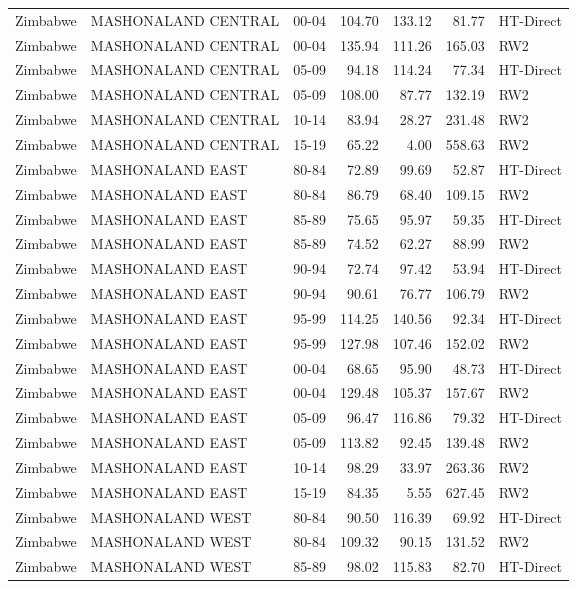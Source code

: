 \begin{longtable}{lllrrrl}
  Zimbabwe & MASHONALAND CENTRAL & 00-04 & 104.70 & 133.12 & 81.77 & HT-Direct \\ 
  Zimbabwe & MASHONALAND CENTRAL & 00-04 & 135.94 & 111.26 & 165.03 & RW2 \\ 
  Zimbabwe & MASHONALAND CENTRAL & 05-09 & 94.18 & 114.24 & 77.34 & HT-Direct \\ 
  Zimbabwe & MASHONALAND CENTRAL & 05-09 & 108.00 & 87.77 & 132.19 & RW2 \\ 
  Zimbabwe & MASHONALAND CENTRAL & 10-14 & 83.94 & 28.27 & 231.48 & RW2 \\ 
  Zimbabwe & MASHONALAND CENTRAL & 15-19 & 65.22 & 4.00 & 558.63 & RW2 \\ 
  Zimbabwe & MASHONALAND EAST & 80-84 & 72.89 & 99.69 & 52.87 & HT-Direct \\ 
  Zimbabwe & MASHONALAND EAST & 80-84 & 86.79 & 68.40 & 109.15 & RW2 \\ 
  Zimbabwe & MASHONALAND EAST & 85-89 & 75.65 & 95.97 & 59.35 & HT-Direct \\ 
  Zimbabwe & MASHONALAND EAST & 85-89 & 74.52 & 62.27 & 88.99 & RW2 \\ 
  Zimbabwe & MASHONALAND EAST & 90-94 & 72.74 & 97.42 & 53.94 & HT-Direct \\ 
  Zimbabwe & MASHONALAND EAST & 90-94 & 90.61 & 76.77 & 106.79 & RW2 \\ 
  Zimbabwe & MASHONALAND EAST & 95-99 & 114.25 & 140.56 & 92.34 & HT-Direct \\ 
  Zimbabwe & MASHONALAND EAST & 95-99 & 127.98 & 107.46 & 152.02 & RW2 \\ 
  Zimbabwe & MASHONALAND EAST & 00-04 & 68.65 & 95.90 & 48.73 & HT-Direct \\ 
  Zimbabwe & MASHONALAND EAST & 00-04 & 129.48 & 105.37 & 157.67 & RW2 \\ 
  Zimbabwe & MASHONALAND EAST & 05-09 & 96.47 & 116.86 & 79.32 & HT-Direct \\ 
  Zimbabwe & MASHONALAND EAST & 05-09 & 113.82 & 92.45 & 139.48 & RW2 \\ 
  Zimbabwe & MASHONALAND EAST & 10-14 & 98.29 & 33.97 & 263.36 & RW2 \\ 
  Zimbabwe & MASHONALAND EAST & 15-19 & 84.35 & 5.55 & 627.45 & RW2 \\ 
  Zimbabwe & MASHONALAND WEST & 80-84 & 90.50 & 116.39 & 69.92 & HT-Direct \\ 
  Zimbabwe & MASHONALAND WEST & 80-84 & 109.32 & 90.15 & 131.52 & RW2 \\ 
  Zimbabwe & MASHONALAND WEST & 85-89 & 98.02 & 115.83 & 82.70 & HT-Direct \\ 

\end{longtable}
